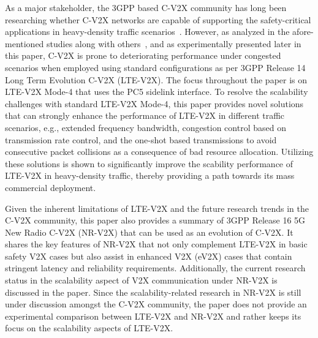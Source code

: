 \documentclass[iicol]{sn-jnl}%
\theoremstyle{thmstyleone}%
\theoremstyle{thmstyletwo}%
\theoremstyle{thmstylethree}%
\begin{document}
As a major stakeholder, the 3GPP based C-V2X community has long been 
researching whether C-V2X networks are capable of supporting the safety-critical applications in heavy-density traffic scenarios\mbox{~\cite{molina2017lte, bazzi2020wireless, toghi2019analysis, saifuddin2020performance, shah2020rve}}.
However, as analyzed in the afore-mentioned studies along with others\mbox{~\cite{toghi2019analysis, yoon2020balancing}}, and as experimentally presented later in this paper, C-V2X is prone to deteriorating performance under congested scenarios when employed using standard configurations as per 3GPP Release 14 Long Term Evolution C-V2X (LTE-V2X).
The focus throughout the paper is on LTE-V2X Mode-4 that uses the PC5 sidelink interface.
To resolve the scalability challenges with standard LTE-V2X Mode-4,
this paper provides novel solutions that can strongly enhance the performance of LTE-V2X in different traffic scenarios, e.g., extended frequency bandwidth, congestion control based on transmission rate control, and the one-shot based transmissions 
to avoid consecutive packet collisions as a consequence of bad resource allocation.
Utilizing these solutions is shown to significantly improve the scability performance of LTE-V2X in heavy-density traffic, thereby providing a path towards its mass commercial deployment.


Given the inherent limitations of LTE-V2X and the future research trends in the C-V2X community, this paper also provides a summary of 3GPP Release 16 5G New Radio C-V2X (NR-V2X) that can be used as an evolution of C-V2X. It shares the key features of NR-V2X that not only complement LTE-V2X in basic safety V2X cases but also assist in enhanced V2X (eV2X) cases that contain stringent latency and reliability requirements. Additionally, the current research status in the scalability aspect of V2X communication under NR-V2X is discussed in the paper.
Since the scalability-related research in NR-V2X is still under discussion amongst the C-V2X community, the paper does not provide an experimental comparison between LTE-V2X and NR-V2X and rather keeps its focus on the scalability aspects of LTE-V2X.
\end{document}
